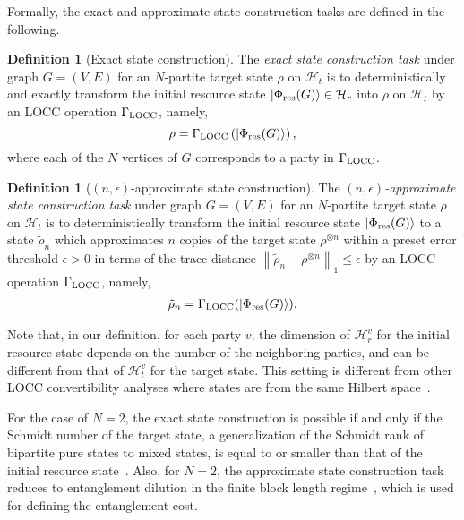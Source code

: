 \documentclass[preprintnumbers,aps,amsmath,amssymb,pra,twocolumn,showpacs,superscriptaddress,floatfix]{revtex4-1}
\def\Ket#1{\left|#1\right\rangle}
\theoremstyle{plain}
\theoremstyle{definition}
\newtheorem{definition}[theorem]{Definition}
\theoremstyle{remark}
\begin{document}
Formally, the exact and approximate state construction tasks are defined in the following.
\begin{definition}[Exact state construction]
The \textit{exact state construction task} under graph $G=(V,E)$ for an $N$-partite target state $\rho$ on $\mathcal{H}_t$ is to deterministically and exactly transform the initial resource state $\Ket{\Phi_{\textup{res}} (G)}\in \mathcal{H}_{r}$ into $\rho$ on $\mathcal{H}_t$ by an LOCC operation $\Gamma_{\textup{LOCC}}$, namely,
\[
\rho=\Gamma_\textup{LOCC}\left(\Ket{\Phi_\textup{res}(G)}\right),
\]
where each of the $N$ vertices of $G$ corresponds to a party in $\Gamma_\textup{LOCC}$.
\end{definition}
\begin{definition}[$(n, \epsilon)$-approximate state construction]
The \textit{$(n, \epsilon)$-approximate state construction task} under graph $G=(V,E)$ for an $N$-partite target state $\rho$ on $\mathcal{H}_t$ is to deterministically transform the initial resource state $\Ket{\Phi_{\textup{res}} (G)}$ to a state $\tilde \rho_n$ which approximates $n$ copies of the target state $\rho^{\otimes n}$ within a preset error threshold $\epsilon >0$ in terms of the trace distance $\left\|\tilde\rho_n - \rho^{\otimes n}\right\| _1 \leq \epsilon$ by an LOCC operation $\Gamma_{\textup{LOCC}}$, namely,
\begin{align*}
\tilde{\rho}_n=\Gamma_{\textup{LOCC}} (\Ket{\Phi_{\textup{res}} (G)} ).
\end{align*}
\end{definition}

Note that, in our definition, for each party $v$, the dimension of $\mathcal{H}^v_r$ for the initial resource state depends on the number of the neighboring parties, and can be different from that of $\mathcal{H}^v_t$ for the target state.  This setting is different from other LOCC convertibility analyses where states are  from the same Hilbert space~\cite{RefWorks:161, PhysRevA.83.022331, arxiv:1606.04418, arxiv:1607.05145}.

For the case of $N=2$, the exact state construction is possible if and only if the Schmidt number of the target state, a generalization of the Schmidt rank of bipartite pure states to mixed states, is equal to or smaller than that of the initial resource state~\cite{RefWorks:157}.    Also, for $N=2$, the approximate state construction task reduces to entanglement dilution in the finite block length regime~\cite{RefWorks:158, RefWorks:159, HierarchyOfInformationQuantities, RefWorks:160}, which is used for defining the entanglement cost.
\end{document}
